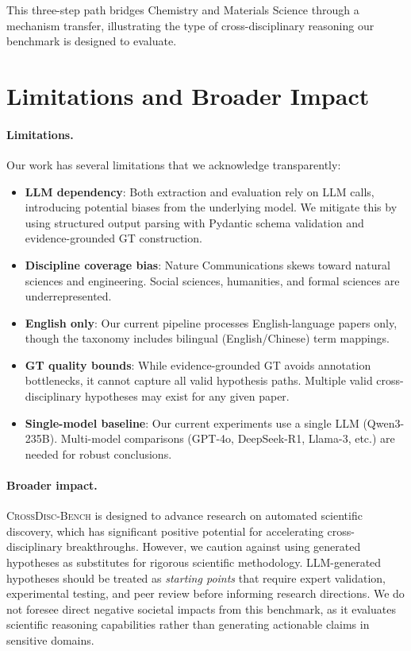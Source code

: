 \documentclass{article}
\newcommand{\ours}{\textsc{CrossDisc-Bench}}
\begin{document}
This three-step path bridges Chemistry and Materials Science through a mechanism transfer, illustrating the type of cross-disciplinary reasoning our benchmark is designed to evaluate.

\section{Limitations and Broader Impact}
\label{sec:limitations}

\paragraph{Limitations.}
Our work has several limitations that we acknowledge transparently:
\begin{itemize}[leftmargin=*,topsep=1pt,itemsep=1pt]
\item \textbf{LLM dependency}: Both extraction and evaluation rely on LLM calls, introducing potential biases from the underlying model. We mitigate this by using structured output parsing with Pydantic schema validation and evidence-grounded GT construction.
\item \textbf{Discipline coverage bias}: Nature Communications skews toward natural sciences and engineering. Social sciences, humanities, and formal sciences are underrepresented.
\item \textbf{English only}: Our current pipeline processes English-language papers only, though the taxonomy includes bilingual (English/Chinese) term mappings.
\item \textbf{GT quality bounds}: While evidence-grounded GT avoids annotation bottlenecks, it cannot capture all valid hypothesis paths. Multiple valid cross-disciplinary hypotheses may exist for any given paper.
\item \textbf{Single-model baseline}: Our current experiments use a single LLM (Qwen3-235B). Multi-model comparisons (GPT-4o, DeepSeek-R1, Llama-3, etc.) are needed for robust conclusions.
\end{itemize}

\paragraph{Broader impact.}
\ours{} is designed to advance research on automated scientific discovery, which has significant positive potential for accelerating cross-disciplinary breakthroughs.
However, we caution against using generated hypotheses as substitutes for rigorous scientific methodology.
LLM-generated hypotheses should be treated as \emph{starting points} that require expert validation, experimental testing, and peer review before informing research directions.
We do not foresee direct negative societal impacts from this benchmark, as it evaluates scientific reasoning capabilities rather than generating actionable claims in sensitive domains.
\end{document}

